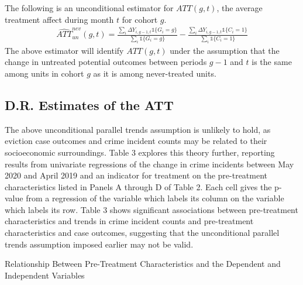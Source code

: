 \documentclass[12pt]{article}
\begin{document}
 
    The following is an unconditional estimator for $ATT(g,t)$, the average treatment affect during month $t$ for cohort $g$.
    \begin{align}
        \hat{ATT}^{nev}_{un}(g, t) = \frac{\sum_i\Delta Y_{i, g-1, t}\mathds{1}\{G_i=g\}}{\sum_i\mathds{1}\{G_i=g\}} - \frac{\sum_i\Delta Y_{i, g-1, t}\mathds{1}\{C_i=1\}}{\sum_i\mathds{1}\{C_i=1\}}
    \end{align}
    The above estimator will identify $ATT(g,t)$ under the assumption that the change in untreated potential outcomes between periods $g-1$ and $t$ is the same among units in cohort $g$ as it is among never-treated units.

    \subsection{D.R. Estimates of the ATT}

    The above unconditional parallel trends assumption is unlikely to hold, as eviction case outcomes and crime incident counts may be related to their socioeconomic surroundings. Table 3 explores this theory further, reporting results from univariate regressions of the change in crime incidents between May 2020 and April 2019 and an indicator for treatment on the pre-treatment characteristics listed in Panels A through D of Table 2. Each cell gives the p-value from a regression of the variable which labels its column on the variable which labels its row. Table 3 shows significant associations between pre-treatment characteristics and trends in crime incident counts and pre-treatment characteristics and case outcomes, suggesting that the unconditional parallel trends assumption imposed earlier may not be valid.

    \begin{table}[H]
        \centering
        
        \caption{Relationship Between Pre-Treatment Characteristics and the Dependent and Independent Variables}
        \label{tab:my_label}
    \end{table}
\end{document}

